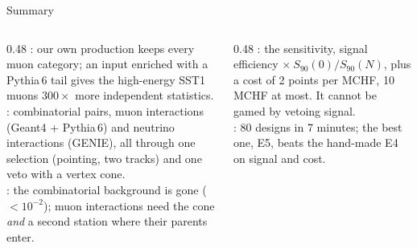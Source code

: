 \documentclass[aspectratio=169,10pt]{beamer}
\begin{document}
\begin{frame}{Summary}
  \begin{columns}[T]
    \begin{column}{0.48\textwidth}\small
      : our own production keeps every muon category; an input enriched with a Pythia\,6 tail gives the high-energy SST1 muons $300\times$ more independent statistics.\\[2mm]
      : combinatorial pairs, muon interactions (Geant4 + Pythia\,6) and neutrino interactions (GENIE), all through one selection (pointing, two tracks) and one veto with a vertex cone.\\[2mm]
      : the combinatorial background is gone ($<10^{-2}$); muon interactions need the cone \emph{and} a second station where their parents enter.
    \end{column}
    \begin{column}{0.48\textwidth}\small
      : the sensitivity, signal efficiency $\times\ S_{90}(0)/S_{90}(N)$, plus a cost of 2 points per MCHF, 10\,MCHF at most. It cannot be gamed by vetoing signal.\\[2mm]
      : 80 designs in 7 minutes; the best one, E5, beats the hand-made E4 on signal and cost.\\[2mm]
    \end{column}
  \end{columns}
\end{frame}
\end{document}
